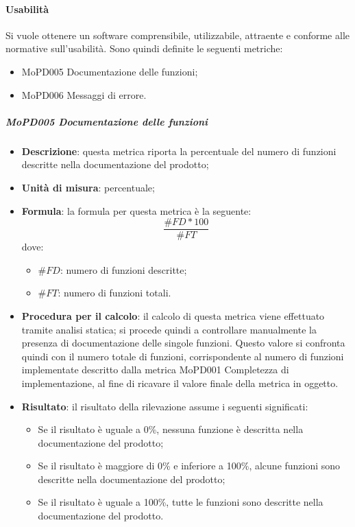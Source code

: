 \documentclass[../norme-di-progetto.tex]{subfiles}
\begin{document}
\paragraph{Usabilità}
Si vuole ottenere un software comprensibile, utilizzabile, attraente e conforme alle normative sull'usabilità. Sono quindi definite le seguenti metriche:
\begin{itemize}
  \item MoPD005 Documentazione delle funzioni;
  \item MoPD006 Messaggi di errore.
\end{itemize}
\subparagraph{MoPD005 Documentazione delle funzioni}
\begin{itemize}
  \item \textbf{Descrizione}: questa metrica riporta la percentuale del numero di funzioni descritte nella documentazione del prodotto;
  \item \textbf{Unità di misura}: percentuale;
  \item \textbf{Formula}: la formula per questa metrica è la seguente:
  \begin{displaymath}
    \frac{\#FD * 100}{\#FT}
  \end{displaymath}
  dove:
  \begin{itemize}
    \item $ \#FD $: numero di funzioni descritte;
    \item $ \#FT $: numero di funzioni totali.
  \end{itemize}
  \item \textbf{Procedura per il calcolo}: il calcolo di questa metrica viene effettuato tramite analisi statica; si procede quindi a controllare manualmente la presenza di documentazione delle singole funzioni. Questo valore si confronta quindi con il numero totale di funzioni, corrispondente al numero di funzioni implementate descritto dalla metrica MoPD001 Completezza di implementazione, al fine di ricavare il valore finale della metrica in oggetto.
  \item \textbf{Risultato}: il risultato della rilevazione assume i seguenti significati:
  \begin{itemize}
    \item Se il risultato è uguale a 0\%, nessuna funzione è descritta nella documentazione del prodotto;
    \item Se il risultato è maggiore di 0\% e inferiore a 100\%, alcune funzioni sono descritte nella documentazione del prodotto;
    \item Se il risultato è uguale a 100\%, tutte le funzioni sono descritte nella documentazione del prodotto.
  \end{itemize}
\end{itemize}
\end{document}
